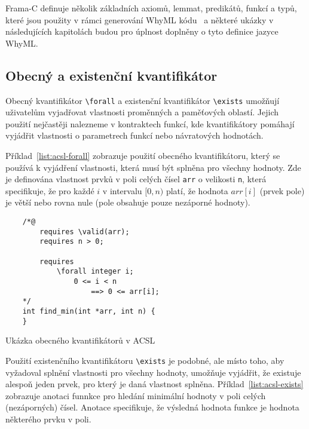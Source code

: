 
Frama\mbox{-}C definuje několik základních axiomů, lemmat, predikátů, funkcí a typů,
které jsou použity v rámci generování WhyML kódu~\cite{FCGitWhy} a
některé ukázky v následujících kapitolách budou pro úplnost doplněny o tyto definice jazyce WhyML\@.

\subsection{Obecný a existenční kvantifikátor}
\label{subsec:anotace-kvantifikatory}


Obecný kvantifikátor \texttt{\textbackslash forall} a existenční kvantifikátor \texttt{\textbackslash exists}
umožňují uživatelům vyjadřovat vlastnosti proměnných a paměťových oblastí.
Jejich použití nejčastěji nalezneme v kontraktech funkcí,
kde kvantifikátory pomáhají vyjádřit vlastnosti o parametrech funkcí nebo návratových hodnotách.


Příklad~\ref{list:acsl-forall} zobrazuje použití obecného kvantifikátoru,
který se používá k vyjádření vlastnosti, která musí být splněna pro všechny hodnoty.
Zde je definována vlastnost prvků v poli celých čísel \texttt{arr} o velikosti \texttt{n},
která specifikuje, že pro každé $i$ v intervalu $[0, n)$ platí,
že hodnota $arr[i]$ (prvek pole) je větší nebo rovna nule (pole obsahuje pouze nezáporné hodnoty).

\begin{listing}[H]
    \begin{verbatim}
    /*@
        requires \valid(arr);
        requires n > 0;

        requires
            \forall integer i;
                0 <= i < n
                    ==> 0 <= arr[i];
    */
    int find_min(int *arr, int n) {
    }
    \end{verbatim}
    \caption{Ukázka obecného kvantifikátorů v ACSL}
    \label{list:acsl-forall}
\end{listing}


Použití existenčního kvantifikátoru \texttt{\textbackslash exists} je podobné,
ale místo toho, aby vyžadoval splnění vlastnosti pro všechny hodnoty,
umožňuje vyjádřit, že existuje alespoň jeden prvek, pro který je daná vlastnost splněna.
Příklad~\ref{list:acsl-exists} zobrazuje anotaci funnkce pro hledání minimální hodnoty v poli celých (nezáporných) čísel.
Anotace specifikuje, že výsledná hodnota funkce je hodnota některého prvku v poli.

